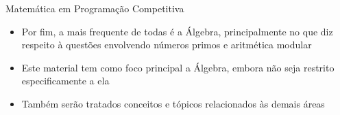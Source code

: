 \begin{frame}[fragile]{Matemática em Programação Competitiva}

    \begin{itemize}
        \item Por fim, a mais frequente de todas é a Álgebra, principalmente no que diz respeito à questões envolvendo números primos e aritmética modular

        \item Este material tem como foco principal a Álgebra, embora não seja restrito especificamente a ela

        \item Também serão tratados conceitos e tópicos relacionados às demais áreas
    \end{itemize}

\end{frame}
